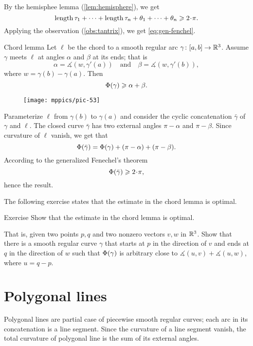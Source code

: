 By the hemisphee lemma (\ref{lem:hemisphere}), we get 
\[\length\tau_1+\dots+\length\tau_n+\theta_1+\dots+\theta_n\ge 2\cdot\pi.\]
Applying the observation (\ref{obs:tantrix}), we get \ref{eq:gen-fenchel}.
\qedsf

\begin{thm}{Chord lemma}\label{lem:chord}
Let $\ell$ be the chord to a smooth regular arc $\gamma\colon[a,b]\to\mathbb{R}^3$.
Assume $\gamma$ meets $\ell$ at angles $\alpha$ and $\beta$ at its ends;
that is 
\[\alpha=\measuredangle(w,\gamma'(a))\quad\text{and}\quad \beta=\measuredangle(w,\gamma'(b)),\]
where $w=\gamma(b)-\gamma(a)$.
Then 
\[\Phi({\gamma})\geqslant \alpha+\beta.\] 

\end{thm}

\begin{wrapfigure}{r}{45 mm}
\vskip-7mm
\centering
\texttt{[image: mppics/pic-53]}
\vskip0mm
\end{wrapfigure}


Parameterize $\ell$ from $\gamma(b)$ to $\gamma(a)$ and consider the cyclic concatenation $\bar\gamma$ of $\gamma$ and $\ell$.
The closed curve $\bar\gamma$ has two external angles $\pi-\alpha$ and $\pi-\beta$.
Since curvature of $\ell$ vanish, we get that 
\[\Phi({\bar\gamma})=\Phi({\gamma})+(\pi-\alpha)+(\pi-\beta).\]
According to the generalized Fenechel's theorem
\[\tc{\bar\gamma}\ge 2\cdot\pi,\]
hence the result.
\qeds

The following exercise states that the estimate in the chord lemma is optimal.

\begin{thm}{Exercise}
Show that the estimate in the chord lemma is optimal.

That is, given two points $p, q$ and two nonzero vectors $v,w$ in $\mathbb{R}^3$.
Show that there is a smooth regular curve $\gamma$ that starts at $p$ in the direction of $v$ and ends at $q$ in the direction of $w$ such that 
$\Phi({\gamma})$ is arbitrary close to $\measuredangle(u,v)+\measuredangle(u,w)$, where $u=q-p$.

\end{thm}

\section*{Polygonal lines} 

Polygonal lines are partial case of piecewise smooth regular curves;
each arc in its concatenation is a line segment.
Since the curvature of a line segment vanish, the total curvature of polygonal line is the sum of its external angles.

